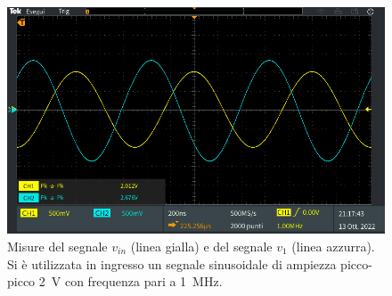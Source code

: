 \begin{figure}[h]
	\centering
	\includegraphics[width=1\linewidth]{./ImageFiles/Laboratorio 2/TEK00050}
	\caption{Misure del segnale $v_{in}$ (linea gialla) e del segnale $v_{1}$ (linea azzurra). Si è utilizzata in ingresso un segnale sinusoidale di ampiezza picco-picco \SI{2}{\volt} con frequenza pari a \SI{1}{\mega\hertz}.}
	\label{fig:analisi_circuito_3_3}
\end{figure}